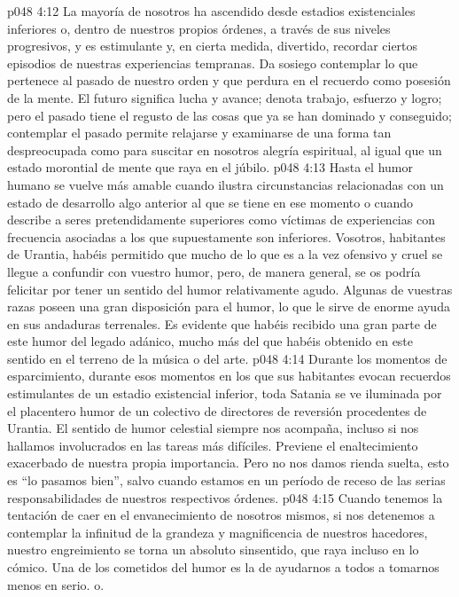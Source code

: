 \vs p048 4:12 La mayoría de nosotros ha ascendido desde estadios existenciales inferiores o, dentro de nuestros propios órdenes, a través de sus niveles progresivos, y es estimulante y, en cierta medida, divertido, recordar ciertos episodios de nuestras experiencias tempranas. Da sosiego contemplar lo que pertenece al pasado de nuestro orden y que perdura en el recuerdo como posesión de la mente. El futuro significa lucha y avance; denota trabajo, esfuerzo y logro; pero el pasado tiene el regusto de las cosas que ya se han dominado y conseguido; contemplar el pasado permite relajarse y examinarse de una forma tan despreocupada como para suscitar en nosotros alegría espiritual, al igual que un estado morontial de mente que raya en el júbilo.
\vs p048 4:13 Hasta el humor humano se vuelve más amable cuando ilustra circunstancias relacionadas con un estado de desarrollo algo anterior al que se tiene en ese momento o cuando describe a seres pretendidamente superiores como víctimas de experiencias con frecuencia asociadas a los que supuestamente son inferiores. Vosotros, habitantes de Urantia, habéis permitido que mucho de lo que es a la vez ofensivo y cruel se llegue a confundir con vuestro humor, pero, de manera general, se os podría felicitar por tener un sentido del humor relativamente agudo. Algunas de vuestras razas poseen una gran disposición para el humor, lo que le sirve de enorme ayuda en sus andaduras terrenales. Es evidente que habéis recibido una gran parte de este humor del legado adánico, mucho más del que habéis obtenido en este sentido en el terreno de la música o del arte.
\vs p048 4:14 \pc Durante los momentos de esparcimiento, durante esos momentos en los que sus habitantes evocan recuerdos estimulantes de un estadio existencial inferior, toda Satania se ve iluminada por el placentero humor de un colectivo de directores de reversión procedentes de Urantia. El sentido de humor celestial siempre nos acompaña, incluso si nos hallamos involucrados en las tareas más difíciles. Previene el enaltecimiento exacerbado de nuestra propia importancia. Pero no nos damos rienda suelta, esto es “lo pasamos bien”, salvo cuando estamos en un período de receso de las serias responsabilidades de nuestros respectivos órdenes.
\vs p048 4:15 Cuando tenemos la tentación de caer en el envanecimiento de nosotros mismos, si nos detenemos a contemplar la infinitud de la grandeza y magnificencia de nuestros hacedores, nuestro engreimiento se torna un absoluto sinsentido, que raya incluso en lo cómico. Una de los cometidos del humor es la de ayudarnos a todos a tomarnos menos en serio. o.
